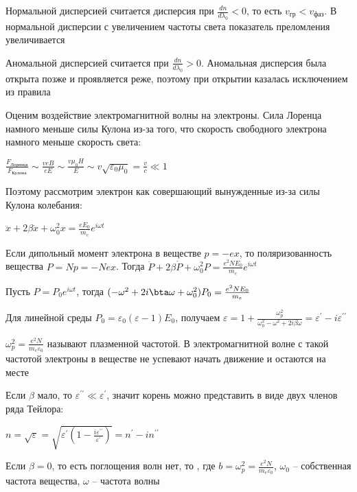 \documentclass[12pt]{article}
\begin{document}





Нормальной дисперсией считается дисперсия при $\frac{dn}{d\lambda_0} < 0$, то есть $v_{\text{гр}} < v_{\text{фаз}}$. В нормальной дисперсии с увеличением частоты света показатель преломления увеличивается

Аномальной дисперсией считается при $\frac{dn}{d\lambda_0} > 0$. Аномальная дисперсия была открыта позже и проявляется реже, поэтому при открытии казалась исключением из правила

\mediumvspace

Оценим воздействие электромагнитной волны на электроны. Сила Лоренца намного меньше силы Кулона из-за того, что скорость свободного электрона намного меньше скорость света:

$\frac{F_{\text{Лоренца}}}{F_{\text{Кулона}}} \sim \frac{v e B}{e E} \sim \frac{v \mu_0 H}{E} \sim v \sqrt{\varepsilon_0 \mu_0} = \frac{v}{c} \ll 1$

Поэтому рассмотрим электрон как совершающий вынужденные из-за силы Кулона колебания:

$\ddot x + 2 \beta \dot x + \omega_0^2 x = \frac{e E_0}{m_e} e^{i \omega t}$

Если дипольный момент электрона в веществе $p = -ex$, то поляризованность вещества $P = Np = -Nex$. Тогда $\ddot P + 2 \beta \dot P + \omega^2_0 P = \frac{e^2 N E_0}{m_e} e^{i \omega t}$

Пусть $P = P_0 e^{i \omega t}$, тогда $(-\omega^2 + 2 i \bta \omega + \omega_0^2) P_0 = \frac{e^2 N E_0}{m_e}$

Для линейной среды $P_0 = \varepsilon_0 (\varepsilon - 1) E_0$, получаем $\varepsilon = 1 + \frac{\omega_p^2}{\omega_0^2 - \omega^2 + 2i\beta \omega} = \varepsilon^{\prime} - i \varepsilon^{\prime\prime}$

$\omega_p^2 = \frac{e^2 N}{m_e \varepsilon_0}$ называют плазменной частотой. В электромагнитной волне с такой частотой электроны в веществе не успевают начать движение и остаются на месте

Если $\beta$ мало, то $\varepsilon^{\prime\prime} \ll \varepsilon^{\prime}$, значит корень можно представить в виде двух членов ряда Тейлора:

$n = \sqrt{\varepsilon} = \sqrt{\varepsilon^{\prime} \left(1 - \frac{i \varepsilon^{\prime\prime}}{\varepsilon^{\prime}}\right)} = n^{\prime} - i n^{\prime\prime}$

Если $\beta = 0$, то есть поглощения волн нет, то , где $b = \omega_p^2 = \frac{e^2 N}{m_e \varepsilon_0}$, $\omega_0$ -- собственная частота вещества, $\omega$ -- частота волны
\end{document}
